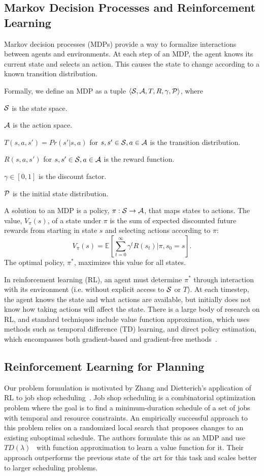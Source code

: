 \subsection{Markov Decision Processes and Reinforcement Learning}
Markov decision processes (MDPs) provide a way to formalize
interactions between agents and environments. At each step of an MDP,
the agent knows its current state and selects an action. This causes the
state to change according to a known transition distribution.
\begin{defn}
Formally, we define an MDP as a tuple $\langle \mathcal{S}, \mathcal{A}, T, R, \gamma, \mathcal{P} \rangle$, where
\begin{tightlist}
\item $\mathcal{S}$ is the state space.
\item $\mathcal{A}$ is the action space.
\item $T(s, a, s') = Pr(s' | s, a)$ for $s, s' \in \mathcal{S}, a \in \mathcal{A}$ is the transition distribution.
\item $R(s, a, s')$ for $s, s' \in \mathcal{S}, a \in \mathcal{A}$ is the reward function.
\item $\gamma \in [0, 1]$ is the discount factor.
\item $\mathcal{P}$ is the initial state distribution.
\end{tightlist}
\end{defn}
A solution to an MDP is a policy, $\pi: \mathcal{S} \rightarrow \mathcal{A}$, that maps states to
actions. The value, $V_{\pi}(s)$, of a state under $\pi$ is the sum of expected
discounted future rewards from starting in state $s$ and selecting actions according
to $\pi$:
$$V_{\pi}(s) = \mathbb{E}[\sum_{t=0}^{\infty}\gamma^{t}R(s_{t}) | \pi, s_{0} = s].$$
The optimal policy, $\pi^{*}$, maximizes this value for all states.

In reinforcement learning (RL), an agent must determine $\pi^{*}$
through interaction with its environment (i.e. without explicit access
to $\mathcal{S}$ or $T$). At each timestep, the agent knows the state and what
actions are available, but initially does not know how taking actions will
affect the state. There is a large body of research on RL, and
standard techniques include value function approximation, which uses methods such as temporal difference
(TD) learning, and direct policy estimation, which encompasses both gradient-based
and gradient-free methods~\cite{suttonbarto}.

\subsection{Reinforcement Learning for Planning}
Our problem formulation is motivated by Zhang and Dietterich's application of RL to job
shop scheduling~\cite{JobShopSched}. Job shop scheduling is a combinatorial optimization problem where the goal is to find
a minimum-duration schedule of a set of jobs with temporal and resource constraints. An empirically
successful approach to this problem relies on a randomized local search that proposes changes to an
existing suboptimal schedule. The authors formulate this as an MDP and use $TD(\lambda)$~\cite{suttonbarto} with function
approximation to learn a value function for it. Their approach outperforms the previous state of the art for this task and
scales better to larger scheduling problems.

